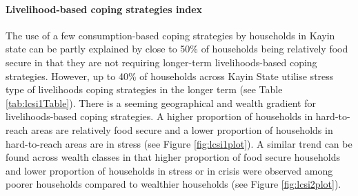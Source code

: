 \documentclass[12pt,a4paper]{article}
\let\oldparagraph\paragraph
\renewcommand{\paragraph}[1]{\oldparagraph{#1}\mbox{}}
\begin{document}
\hypertarget{lcsi-results}{%
\paragraph{Livelihood-based coping strategies index}\label{lcsi-results}}

The use of a few consumption-based coping strategies by households in Kayin state can be partly explained by close to 50\% of households being relatively food secure in that they are not requiring longer-term livelihoods-based coping strategies. However, up to 40\% of households across Kayin State utilise stress type of livelihoods coping strategies in the longer term (see Table \ref{tab:lcsi1Table}). There is a seeming geographical and wealth gradient for livelihoods-based coping strategies. A higher proportion of households in hard-to-reach areas are relatively food secure and a lower proportion of households in hard-to-reach areas are in stress (see Figure \ref{fig:lcsi1plot}). A similar trend can be found across wealth classes in that higher proportion of food secure households and lower proportion of households in stress or in crisis were observed among poorer households compared to wealthier households (see Figure \ref{fig:lcsi2plot}).
\end{document}
